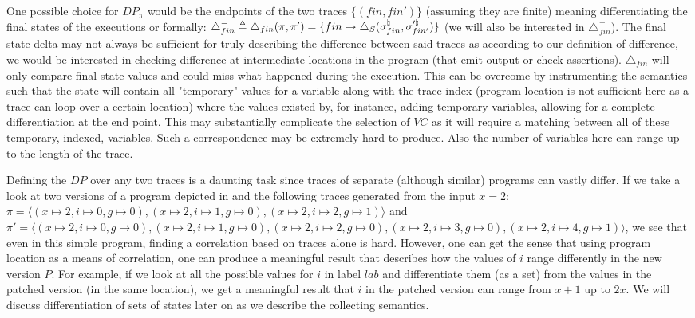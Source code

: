 One possible choice for $DP_{\pi}$ would be the endpoints of the two traces $\{(fin,fin')\}$ (assuming they are finite) meaning differentiating the final states of the executions or formally: $\triangle_{fin}^{-} \triangleq \triangle_{fin}(\pi,\pi') = \{fin\mapsto\triangle_{S}(\sigma^\natural_{fin},\sigma'^\natural_{fin'})\}$ (we will also be interested in $\triangle_{fin}^{+}$). The final state delta may not always be sufficient for truly describing the difference between said traces as according to our definition of difference, we would be interested in checking difference at intermediate locations in the program (that emit output or check assertions). $\triangle_{fin}$ will only compare final state values and could miss what happened during the execution. This can be overcome by instrumenting the semantics such that the state will contain all "temporary" values for a variable along with the trace index (program location is not sufficient here as a trace can loop over a certain location) where the values existed by, for instance, adding temporary variables, allowing for a complete differentiation at the end point. This may substantially complicate the selection of $VC$ as it will require a matching between all of these temporary, indexed, variables. Such a correspondence may be extremely hard to produce. Also the number of variables here can range up to the length of the trace.

Defining the $DP$ over any two traces is a daunting task since traces of separate (although similar) programs can vastly differ. If we take a look at two versions of a program depicted in  and the following traces generated from the input $x=2$: $\pi = \langle (x \mapsto 2,i \mapsto 0, g \mapsto 0),(x \mapsto 2,i \mapsto 1, g \mapsto 0),(x \mapsto 2,i \mapsto 2, g \mapsto 1) \rangle$ and $\pi' = \langle (x \mapsto 2,i \mapsto 0, g \mapsto 0),(x \mapsto 2,i \mapsto 1, g \mapsto 0),(x \mapsto 2,i \mapsto 2, g \mapsto 0),(x \mapsto 2,i \mapsto 3, g \mapsto 0),(x \mapsto 2,i \mapsto 4, g \mapsto 1)\rangle$, we see that even in this simple program, finding a correlation based on traces alone is hard. However, one can get the sense that using program location as a means of correlation, one can produce a meaningful result that describes how the values of $i$ range differently in the new version $P$. For example, if we look at all the possible values for $i$ in label $lab$ and differentiate them (as a set) from the values in the patched version (in the same location), we get a meaningful result that $i$ in the patched version can range from $x+1$ up to $2x$. We will discuss differentiation of sets of states later on as we describe the collecting semantics.

